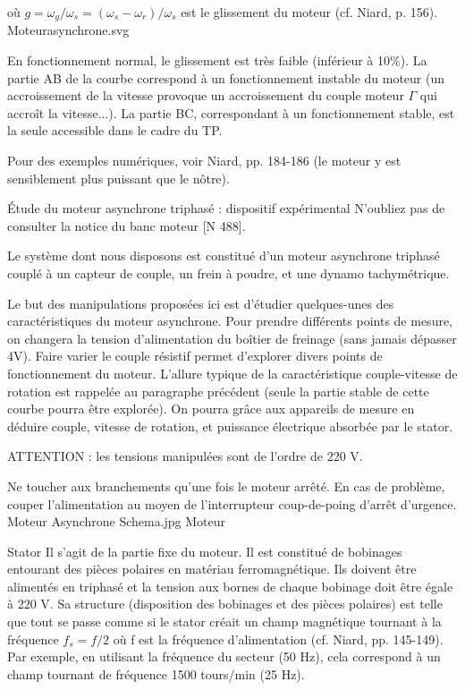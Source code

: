 \documentclass{article}%
\begin{document}
où $g = \omega_g /\omega_s = (\omega_s - \omega_r)/\omega_s$ est le glissement du moteur (cf. Niard, p. 156).
Moteurasynchrone.svg


En fonctionnement normal, le glissement est très faible (inférieur à 10\%). La partie AB de la courbe correspond à un fonctionnement instable du moteur (un accroissement de la vitesse provoque un accroissement du couple moteur $\Gamma$ qui accroît la vitesse...). La partie BC, correspondant à un fonctionnement stable, est la seule accessible dans le cadre du TP.

Pour des exemples numériques, voir Niard, pp. 184-186 (le moteur y est sensiblement plus puissant que le nôtre).


Étude du moteur asynchrone triphasé : dispositif expérimental
N'oubliez pas de consulter la notice du banc moteur [N 488].

Le système dont nous disposons est constitué d'un moteur asynchrone triphasé couplé à un capteur de couple, un frein à poudre, et une dynamo tachymétrique.

Le but des manipulations proposées ici est d'étudier quelques-unes des caractéristiques du moteur asynchrone. Pour prendre différents points de mesure, on changera la tension d'alimentation du boîtier de freinage (sans jamais dépasser 4V). Faire varier le couple résistif permet d'explorer divers points de fonctionnement du moteur. L'allure typique de la caractéristique couple-vitesse de rotation est rappelée au paragraphe précédent (seule la partie stable de cette courbe pourra être explorée). On pourra grâce aux appareils de mesure en déduire couple, vitesse de rotation, et puissance électrique absorbée par le stator.


ATTENTION : les tensions manipulées sont de l'ordre de 220 V.

Ne toucher aux branchements qu'une fois le moteur arrêté.
En cas de problème, couper l'alimentation au moyen de l'interrupteur coup-de-poing d'arrêt d'urgence.
Moteur Asynchrone Schema.jpg
Moteur

Stator
    Il s'agit de la partie fixe du moteur. Il est constitué de bobinages entourant des pièces polaires en matériau ferromagnétique. Ils doivent être alimentés en triphasé et la tension aux bornes de chaque bobinage doit être égale à 220 V. Sa structure (disposition des bobinages et des pièces polaires) est telle que tout se passe comme si le stator créait un champ magnétique tournant à la fréquence $f_s = f/2$ où f est la fréquence d'alimentation (cf. Niard, pp. 145-149). Par exemple, en utilisant la fréquence du secteur (50 Hz), cela correspond à un champ tournant de fréquence 1500 tours/min (25 Hz).
\end{document}

